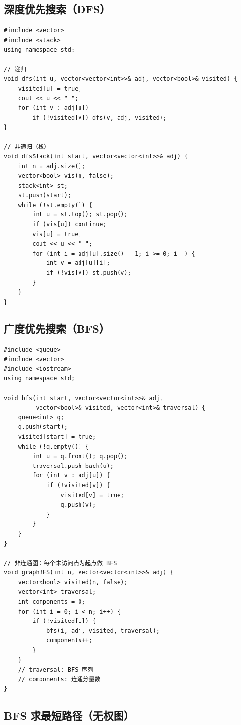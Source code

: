 \documentclass[12pt,a4paper]{article}
\begin{document}
\subsection{深度优先搜索（DFS）}

\begin{lstlisting}[caption={DFS 递归 / 非递归}]
#include <vector>
#include <stack>
using namespace std;

// 递归
void dfs(int u, vector<vector<int>>& adj, vector<bool>& visited) {
    visited[u] = true;
    cout << u << " ";
    for (int v : adj[u])
        if (!visited[v]) dfs(v, adj, visited);
}

// 非递归（栈）
void dfsStack(int start, vector<vector<int>>& adj) {
    int n = adj.size();
    vector<bool> vis(n, false);
    stack<int> st;
    st.push(start);
    while (!st.empty()) {
        int u = st.top(); st.pop();
        if (vis[u]) continue;
        vis[u] = true;
        cout << u << " ";
        for (int i = adj[u].size() - 1; i >= 0; i--) {
            int v = adj[u][i];
            if (!vis[v]) st.push(v);
        }
    }
}
\end{lstlisting}

\subsection{广度优先搜索（BFS）}

\begin{lstlisting}[caption={BFS 实现（含非连通图处理）}]
#include <queue>
#include <vector>
#include <iostream>
using namespace std;

void bfs(int start, vector<vector<int>>& adj,
         vector<bool>& visited, vector<int>& traversal) {
    queue<int> q;
    q.push(start);
    visited[start] = true;
    while (!q.empty()) {
        int u = q.front(); q.pop();
        traversal.push_back(u);
        for (int v : adj[u]) {
            if (!visited[v]) {
                visited[v] = true;
                q.push(v);
            }
        }
    }
}

// 非连通图：每个未访问点为起点做 BFS
void graphBFS(int n, vector<vector<int>>& adj) {
    vector<bool> visited(n, false);
    vector<int> traversal;
    int components = 0;
    for (int i = 0; i < n; i++) {
        if (!visited[i]) {
            bfs(i, adj, visited, traversal);
            components++;
        }
    }
    // traversal: BFS 序列
    // components: 连通分量数
}
\end{lstlisting}

\subsection{BFS 求最短路径（无权图）}
\end{document}
